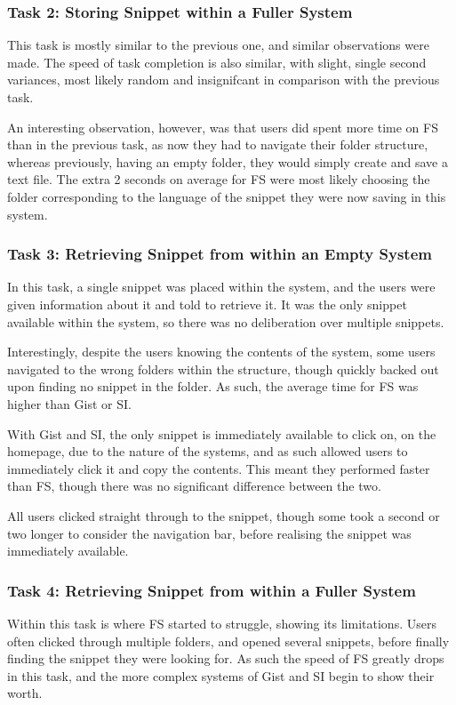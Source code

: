 \subsubsection{Task 2: Storing Snippet within a Fuller System}
This task is mostly similar to the previous one, and similar observations were made.
The speed of task completion is also similar, with slight, single second variances, most likely random and insignifcant in comparison with the previous task.

An interesting observation, however, was that users did spent more time on FS than in the previous task, as now they had to navigate their folder structure, whereas previously, having an empty folder, they would simply create and save a text file.
The extra 2 seconds on average for FS were most likely choosing the folder corresponding to the language of the snippet they were now saving in this system.

\subsubsection{Task 3: Retrieving Snippet from within an Empty System}
In this task, a single snippet was placed within the system, and the users were given information about it and told to retrieve it.
It was the only snippet available within the system, so there was no deliberation over multiple snippets.

Interestingly, despite the users knowing the contents of the system, some users navigated to the wrong folders within the structure, though quickly backed out upon finding no snippet in the folder.
As such, the average time for FS was higher than Gist or SI.

With Gist and SI, the only snippet is immediately available to click on, on the homepage, due to the nature of the systems, and as such allowed users to immediately click it and copy the contents.
This meant they performed faster than FS, though there was no significant difference between the two. 

All users clicked straight through to the snippet, though some took a second or two longer to consider the navigation bar, before realising the snippet was immediately available.

\subsubsection{Task 4: Retrieving Snippet from within a Fuller System}
Within this task is where FS started to struggle, showing its limitations.
Users often clicked through multiple folders, and opened several snippets, before finally finding the snippet they were looking for.
As such the speed of FS greatly drops in this task, and the more complex systems of Gist and SI begin to show their worth.

